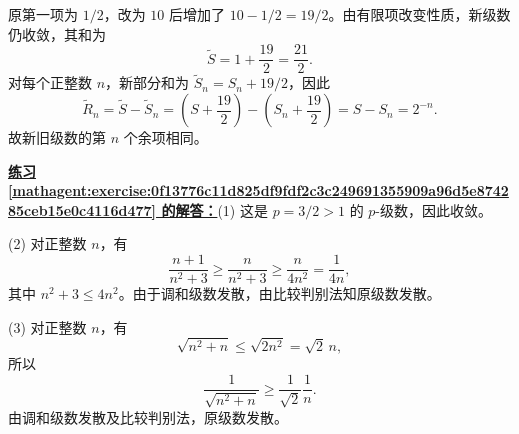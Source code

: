 \documentclass[UTF8,fontset=fandol,11pt]{ctexart}
\begin{document}
原第一项为 $1/2$，改为 $10$ 后增加了 $10-1/2=19/2$。由有限项改变性质，新级数仍收敛，其和为
\[
\widetilde S=1+\frac{19}{2}=\frac{21}{2}.
\]
对每个正整数 $n$，新部分和为 $\widetilde S_n=S_n+19/2$，因此
\[
\widetilde R_n=\widetilde S-\widetilde S_n
=\left(S+\frac{19}{2}\right)-\left(S_n+\frac{19}{2}\right)
=S-S_n=2^{-n}.
\]
故新旧级数的第 $n$ 个余项相同。\par
\par\noindent\textbf{\hyperref[mathagent:exercise:0f13776c11d825df9fdf2c3c249691355909a96d5e874285ceb15e0c4116d477]{练习 \ref*{mathagent:exercise:0f13776c11d825df9fdf2c3c249691355909a96d5e874285ceb15e0c4116d477} 的解答：}}(1) 这是 $p=3/2>1$ 的 $p$-级数，因此收敛。

(2) 对正整数 $n$，有
\[
\frac{n+1}{n^2+3}\geq\frac{n}{n^2+3}\geq\frac{n}{4n^2}=\frac{1}{4n},
\]
其中 $n^2+3\leq4n^2$。由于调和级数发散，由比较判别法知原级数发散。

(3) 对正整数 $n$，有
\[
\sqrt{n^2+n}\leq\sqrt{2n^2}=\sqrt{2}\,n,
\]
所以
\[
\frac{1}{\sqrt{n^2+n}}\geq\frac{1}{\sqrt{2}}\frac{1}{n}.
\]
由调和级数发散及比较判别法，原级数发散。\par
\end{document}
